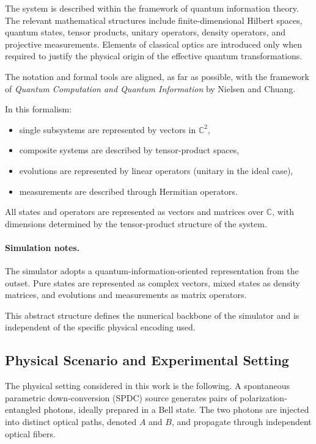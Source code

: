 \documentclass[a4paper]{article}
\begin{document}
The system is described within the framework of quantum information theory. The relevant mathematical structures include finite-dimensional Hilbert spaces, quantum states, tensor products, unitary operators, density operators, and projective measurements. Elements of classical optics are introduced only when required to justify the physical origin of the effective quantum transformations.

The notation and formal tools are aligned, as far as possible, with the framework of \textit{Quantum Computation and Quantum Information} by Nielsen and Chuang.

In this formalism:
\begin{itemize}
    \item single subsystems are represented by vectors in \(\mathbb{C}^2\),
    \item composite systems are described by tensor-product spaces,
    \item evolutions are represented by linear operators (unitary in the ideal case),
    \item measurements are described through Hermitian operators.
\end{itemize}

All states and operators are represented as vectors and matrices over \(\mathbb{C}\), with dimensions determined by the tensor-product structure of the system.

\paragraph{Simulation notes.}
The simulator adopts a quantum-information-oriented representation from the outset. Pure states are represented as complex vectors, mixed states as density matrices, and evolutions and measurements as matrix operators.

This abstract structure defines the numerical backbone of the simulator and is independent of the specific physical encoding used.


\subsection{Physical Scenario and Experimental Setting}

The physical setting considered in this work is the following. A spontaneous parametric down-conversion (SPDC) source generates pairs of polarization-entangled photons, ideally prepared in a Bell state. The two photons are injected into distinct optical paths, denoted \(A\) and \(B\), and propagate through independent optical fibers.
\end{document}
